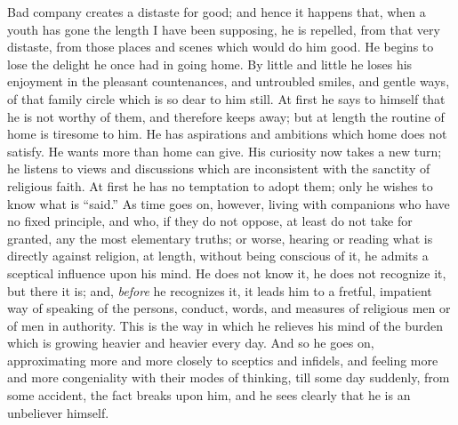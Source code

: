 Bad company creates a distaste for good; and hence it
happens that, when a youth has gone the length I have
been supposing, he is repelled, from that very distaste,
from those places and scenes which would do him good. He
begins to lose the delight he once had in going home. By
little and little he loses his enjoyment in the pleasant
countenances, and untroubled smiles, and gentle ways, of
that family circle which is so dear to him still. At
first he says to himself that he is not worthy of them,
and therefore keeps away; but at length the routine of
home is tiresome to him. He has aspirations and ambitions
which home does not satisfy. He wants more than home can
give. His curiosity now takes a new turn; he listens to
views and discussions which are inconsistent with the
sanctity of religious faith. At first he has no
temptation to adopt them; only he wishes to know what is
``said.'' As time goes on, however, living with
companions who have no fixed principle, and who, if they
do not oppose, at least do not take for granted, any the
most elementary truths; or worse, hearing or reading what
is directly against religion, at length, without being
conscious of it, he admits a sceptical influence upon his
mind. He does not know it, he does not recognize it, but
there it is; and, \emph{before} he recognizes it, it
leads him to a fretful, impatient way of speaking of the
persons, conduct, words, and measures of religious men or
of men in authority. This is the way in which he relieves
his mind of the burden which is growing heavier and
heavier every day. And so he goes on, approximating more
and more closely to sceptics and infidels, and feeling
more and more congeniality with their modes of thinking,
till some day suddenly, from some accident, the fact
breaks upon him, and he sees clearly that he is an
unbeliever himself.

